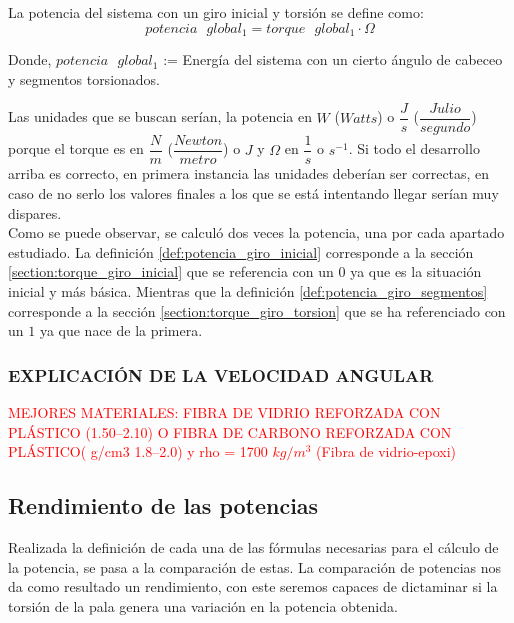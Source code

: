    \begin{definicion}
 La potencia del sistema con un giro inicial y torsión se define como:
 $$ potencia \text{ } global_1 = torque \text{ } global_1 \cdot \Omega $$ 
 
 Donde,
 \centering $potencia \text{ } global_1$ := Energía del sistema con un cierto ángulo de cabeceo y segmentos torsionados.
 \label{def:potencia_giro_segmentos}
 \end{definicion}
 
 
Las unidades que se buscan serían, la potencia en $W$ ($Watts$) o $\dfrac{J}{s}$ ($\dfrac{Julio}{segundo}$) porque el torque es en $\dfrac{N}{m}$ ($\dfrac{Newton}{metro}$) o $J$ y $\Omega$ en $\dfrac{1}{s}$ o $s^{-1}$. Si todo el desarrollo arriba es correcto, en primera instancia las unidades deberían ser correctas, en caso de no serlo los valores finales a los que se está intentando llegar serían muy dispares. \\

 
 Como se puede observar, se calculó dos veces la potencia, una por cada apartado estudiado. La definición \ref{def:potencia_giro_inicial} corresponde a la sección \ref{section:torque_giro_inicial} que se referencia con un $0$ ya que es la situación inicial y más básica. Mientras que la definición \ref{def:potencia_giro_segmentos} corresponde a la sección \ref{section:torque_giro_torsion} que se ha referenciado con un $1$ ya que nace de la primera.
 
 
\subsubsection{EXPLICACIÓN DE LA VELOCIDAD ANGULAR}

 
 
 
\textcolor{red}{\Large{MEJORES MATERIALES: FIBRA DE VIDRIO REFORZADA CON PLÁSTICO (1.50–2.10) O FIBRA DE CARBONO REFORZADA CON PLÁSTICO( g/cm3	1.8–2.0) y rho = 1700 $kg/m^3$ (Fibra de vidrio-epoxi) }}
 
 
 \subsection{Rendimiento de las potencias}
 \label{section:rendimiento}
 
Realizada la definición de cada una de las fórmulas necesarias para el cálculo de la potencia, se pasa a la comparación de estas. La comparación de potencias nos da como resultado un rendimiento, con este seremos capaces de dictaminar si la torsión de la pala genera una variación en la potencia obtenida.
 
